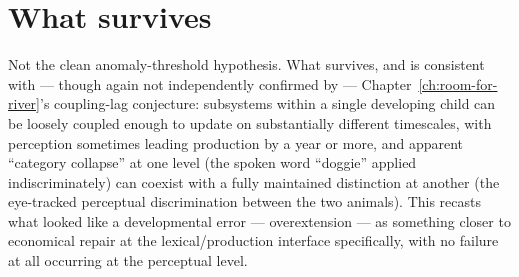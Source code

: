 \section{What survives}

Not the clean anomaly-threshold hypothesis. What survives, and is consistent with --- though again not independently confirmed by --- Chapter~\ref{ch:room-for-river}'s coupling-lag conjecture: subsystems within a single developing child can be loosely coupled enough to update on substantially different timescales, with perception sometimes leading production by a year or more, and apparent ``category collapse'' at one level (the spoken word ``doggie'' applied indiscriminately) can coexist with a fully maintained distinction at another (the eye-tracked perceptual discrimination between the two animals). This recasts what looked like a developmental error --- overextension --- as something closer to economical repair at the lexical/production interface specifically, with no failure at all occurring at the perceptual level.
